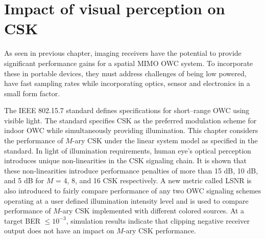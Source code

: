 \chapter[Optical color MIMO: Impact of visual perception on CSK]{Impact of visual perception on CSK}
\label{chapter:mimoColor}
\thispagestyle{myheadings}
As seen in previous chapter, imaging receivers have the potential to provide significant performance gains for a spatial MIMO OWC system. To incorporate these in portable devices, they must address challenges of being low powered, have fast sampling rates while incorporating optics, sensor and electronics in a small form factor.

The IEEE 802.15.7 standard defines specifications for short--range OWC using visible light. The standard specifies CSK as the preferred modulation scheme for indoor OWC while simultaneously providing illumination. This chapter considers the performance of $M$-ary CSK under the linear system model as specified in the standard. In light of illumination requirements, human eye's optical perception introduces unique non-linearities in the CSK signaling chain. It is shown that these non-linearities introduce performance penalties of more than 15 dB, 10 dB, and 5 dB for $M$ = 4, 8, and 16 CSK respectively. A new metric called LSNR is also introduced to fairly compare performance of any two OWC signaling schemes operating at a user defined illumination intensity level and is used to compare performance of $M$-ary CSK implemented with different colored sources. At a target BER $\leq 10^{-3}$, simulation results indicate that clipping negative receiver output does not have an impact on $M$-ary CSK performance.





